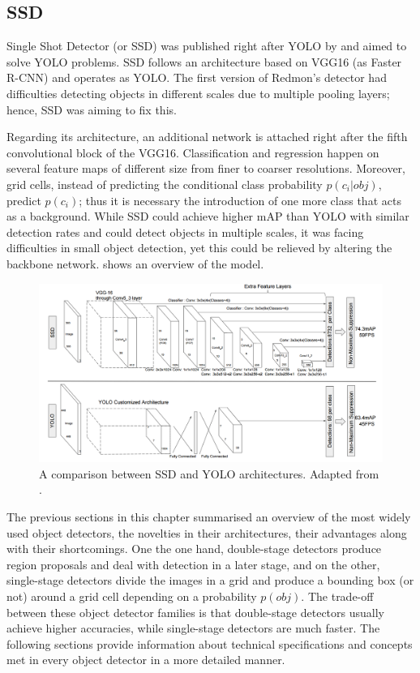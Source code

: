 \subsection{SSD}
Single Shot Detector (or SSD) was published right after YOLO by \cite{liu2016ssd} and aimed to solve YOLO problems. SSD follows an architecture based on VGG16 (as Faster R-CNN) and operates as YOLO. The first version of Redmon's detector had difficulties detecting objects in different scales due to multiple pooling layers; hence, SSD was aiming to fix this. 

Regarding its architecture, an additional network is attached right after the fifth convolutional block of the VGG16. Classification and regression happen on several feature maps of different size from finer to coarser resolutions. Moreover, grid cells, instead of predicting the conditional class probability $p(c_i|obj)$, predict $p(c_i)$; thus it is necessary the introduction of one more class that acts as a background. While SSD could achieve higher mAP than YOLO with similar detection rates and could detect objects in multiple scales, it was facing difficulties in small object detection, yet this could be relieved by altering the backbone network.   shows an overview of the model.
 
\begin{figure}[!htb]
  \centering
  \includegraphics[width=12cm]{figures/ch2/fig6.png}
  \caption{A comparison between SSD and YOLO architectures. Adapted from \cite{liu2016ssd}.}
  \label{fig6}
\end{figure} 
 
The previous sections in this chapter summarised an overview of the most widely used object detectors, the novelties in their architectures, their advantages along with their shortcomings. One the one hand, double-stage detectors produce region proposals and deal with detection in a later stage, and on the other, single-stage detectors divide the images in a grid and produce a bounding box (or not) around a grid cell depending on a probability $p(obj)$. The trade-off between these object detector families is that double-stage detectors usually achieve higher accuracies, while single-stage detectors are much faster. The following sections provide information about technical specifications and concepts met in every object detector in a more detailed manner.

